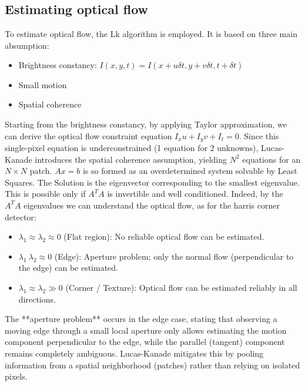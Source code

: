 
\section[Question -- {\it Estimating optical flow}]{}

\subsection{Estimating optical flow}
To estimate optical flow, the Lk algorithm is employed. It is based on three main absumption:
\begin{itemize}
    \item Brightness constancy: $I(x, y, t) = I(x+u \delta t, y+v \delta t, t+\delta t)$
    \item Small motion
    \item Spatial coherence
\end{itemize}

Starting from the brightness constancy, by applying Taylor approximation, we can derive the optical flow constraint equation
$I_x u + I_y v+ I_t = 0$. 
Since this single-pixel equation is underconstrained (1 equation for 2 unknowns), Lucas-Kanade introduces the spatial coherence assumption, yielding $N^2$ equations for an $N \times N$ patch.
$Ax = b$ is so formed as an overdetermined system solvable by Least Squares. The Solution is the eigenvector corresponding to 
the smallest eigenvalue.
This is possible only if $A^T A$ is invertible and well conditioned. Indeed, by the $A^T A$ eigenvalues we can understand
the optical flow, as for the harris corner detector:
\begin{itemize}
    \item $\lambda_1 \approx \lambda_2 \approx 0$ (Flat region): No reliable optical flow can be estimated.
    \item $\lambda_1 \ \lambda_2 \approx 0$ (Edge): Aperture problem; only the normal flow (perpendicular to the edge) can be estimated.
    \item $\lambda_1 \approx \lambda_2 \gg 0$ (Corner / Texture): Optical flow can be estimated reliably in all directions.
\end{itemize}

The **aperture problem** occurs in the edge case, stating that observing a moving edge through a small local aperture 
only allows estimating the motion component perpendicular to the edge, while the parallel (tangent) component 
remains completely ambiguous. Lucas-Kanade mitigates this by pooling information from a spatial neighborhood (patches) 
rather than relying on isolated pixels.
